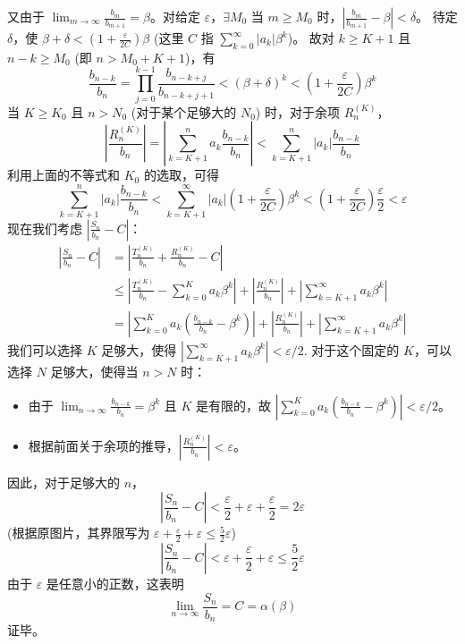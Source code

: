 \documentclass[12pt, a4paper]{article}
\begin{document}
又由于 $\lim_{m \to \infty} \frac{b_m}{b_{m+1}} = \beta$。对给定 $\varepsilon$，$\exists M_0$ 当 $m \ge M_0$ 时，$\left| \frac{b_m}{b_{m+1}} - \beta \right| < \delta$。
待定 $\delta$，使 $\beta+\delta < \left(1+\frac{\varepsilon}{2C}\right)\beta$ (这里 $C$ 指 $\sum_{k=0}^\infty |a_k| \beta^k$)。
故对 $k \ge K+1$ 且 $n-k \ge M_0$ (即 $n > M_0+K+1$)，有
\[ \frac{b_{n-k}}{b_n} = \prod_{j=0}^{k-1} \frac{b_{n-k+j}}{b_{n-k+j+1}} < (\beta+\delta)^k < \left(1+\frac{\varepsilon}{2C}\right) \beta^k \]
当 $K \ge K_0$ 且 $n > N_0$ (对于某个足够大的 $N_0$) 时，对于余项 $R_n^{(K)}$，
\[ \left| \frac{R_n^{(K)}}{b_n} \right| = \left| \sum_{k=K+1}^n a_k \frac{b_{n-k}}{b_n} \right| < \sum_{k=K+1}^n |a_k| \frac{b_{n-k}}{b_n} \]
利用上面的不等式和 $K_0$ 的选取，可得
\[ \sum_{k=K+1}^n |a_k| \frac{b_{n-k}}{b_n} < \sum_{k=K+1}^\infty |a_k| \left(1+\frac{\varepsilon}{2C}\right)\beta^k < \left(1+\frac{\varepsilon}{2C}\right) \frac{\varepsilon}{2} < \varepsilon \]
现在我们考虑 $\left| \frac{S_n}{b_n} - C \right|$：
\begin{align*}
\left| \frac{S_n}{b_n} - C \right| &= \left| \frac{T_n^{(K)}}{b_n} + \frac{R_n^{(K)}}{b_n} - C \right| \\
&\le \left| \frac{T_n^{(K)}}{b_n} - \sum_{k=0}^K a_k \beta^k \right| + \left| \frac{R_n^{(K)}}{b_n} \right| + \left| \sum_{k=K+1}^\infty a_k \beta^k \right| \\
&= \left| \sum_{k=0}^K a_k \left( \frac{b_{n-k}}{b_n} - \beta^k \right) \right| + \left| \frac{R_n^{(K)}}{b_n} \right| + \left| \sum_{k=K+1}^\infty a_k \beta^k \right|
\end{align*}
我们可以选择 $K$ 足够大，使得 $\left| \sum_{k=K+1}^\infty a_k \beta^k \right| < \varepsilon/2$.
对于这个固定的 $K$，可以选择 $N$ 足够大，使得当 $n > N$ 时：
\begin{itemize}
    \item 由于 $\lim_{n \to \infty} \frac{b_{n-k}}{b_n} = \beta^k$ 且 $K$ 是有限的，故 $\left| \sum_{k=0}^K a_k \left( \frac{b_{n-k}}{b_n} - \beta^k \right) \right| < \varepsilon/2$。
    \item 根据前面关于余项的推导，$\left| \frac{R_n^{(K)}}{b_n} \right| < \varepsilon$。
\end{itemize}
因此，对于足够大的 $n$，
\[ \left| \frac{S_n}{b_n} - C \right| < \frac{\varepsilon}{2} + \varepsilon + \frac{\varepsilon}{2} = 2\varepsilon \]
(根据原图片，其界限写为 $\varepsilon + \frac{\varepsilon}{2} + \varepsilon \le \frac{5}{2}\varepsilon$)
\[ \left| \frac{S_n}{b_n} - C \right| < \varepsilon + \frac{\varepsilon}{2} + \varepsilon \le \frac{5}{2}\varepsilon \]
由于 $\varepsilon$ 是任意小的正数，这表明
\[ \lim_{n \to \infty} \frac{S_n}{b_n} = C = \alpha(\beta) \]
证毕。
\end{document}
